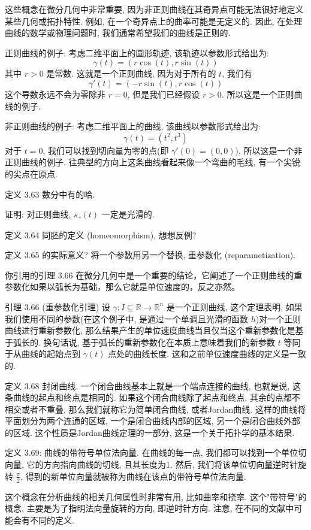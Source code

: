 \documentclass[a4paper]{ctexart}
\begin{document}
{这些概念在微分几何中非常重要, 因为非正则曲线在其奇异点可能无法很好地定义某些几何或拓扑特性. 
例如, 在一个奇异点上的曲率可能是无定义的. 因此, 在处理曲线的数学或物理问题时, 我们通常希望我们的曲线是正则的. 

正则曲线的例子: 考虑二维平面上的圆形轨迹, 该轨迹以参数形式给出为: 
$$
\gamma(t) = (r\cos(t), r\sin(t))
$$
其中 $r > 0$ 是常数. 这就是一个正则曲线, 因为对于所有的 $t$, 我们有
$$
\gamma'(t) = (-r\sin(t), r\cos(t))
$$
这个导数永远不会为零除非 $r = 0$, 但是我们已经假设 $r > 0$. 所以这是一个正则曲线的例子. 

非正则曲线的例子: 考虑二维平面上的曲线, 该曲线以参数形式给出为:
$$\gamma(t) = (t^2, t^3)$$ 对于 $t=0$, 我们可以找到切向量为零的点(即 $\gamma'(0) = (0,0)$), 
所以这是一个非正则曲线的例子. 往典型的方向上这条曲线看起来像一个弯曲的毛线, 有一个尖锐的尖点在原点. 

定义 3.63 数分中有的哈.

证明: 对正则曲线, $s_\gamma(t)$ 一定是光滑的.

定义 3.64 同胚的定义 (homeomorphism), 想想反例?

定义 3.65 的实际意义? 将一个参数用另一个替换, 重参数化 (reparametization).

你引用的引理 3.66 在微分几何中是一个重要的结论，它阐述了一个正则曲线的重参数化如果以弧长为基础，那么它就是单位速度的，反之亦然。

引理 3.66 (重参数化引理) 设 $\gamma: I \subseteq \mathbb{R} \rightarrow \mathbb{R}^n$ 是一个正则曲线, 这个定理表明, 
如果我们使用不同的参数(在这个例子中, 是通过一个单调且光滑的函数 $h$)对一个正则曲线进行重新参数化, 
那么结果产生的单位速度曲线当且仅当这个重新参数化是基于弧长的. 
换句话说, 基于弧长的重新参数化在本质上意味着我们的新参数 $t$ 等同于从曲线的起始点到 $\gamma(t)$ 点处的曲线长度. 
这和之前单位速度曲线的定义是一致的. 


定义 3.68 封闭曲线. 一个闭合曲线基本上就是一个端点连接的曲线, 也就是说, 这条曲线的起点和终点是相同的. 
如果这个闭合曲线除了起点和终点, 其余的点都不相交或者不重叠, 那么我们就称它为简单闭合曲线, 或者Jordan曲线. 
这样的曲线将平面划分为两个连通的区域, 一个是闭合曲线内部的区域, 另一个是闭合曲线外部的区域. 
这个性质是Jordan曲线定理的一部分, 这是一个关于拓扑学的基本结果. 

定义 3.69: 曲线的带符号单位法向量. 在曲线的每一点, 我们都可以找到一个单位切向量, 它的方向指向曲线的切线, 
且其长度为1. 然后, 我们将该单位切向量逆时针旋转 $\frac{\pi}{2}$, 得到的新单位向量就被称为曲线在该点的带符号单位法向量.

这个概念在分析曲线的相关几何属性时非常有用, 比如曲率和挠率. 这个"带符号"的概念, 
主要是为了指明法向量旋转的方向, 即逆时针方向. 注意, 在不同的文献中可能会有不同的定义. 

}
\end{document}
